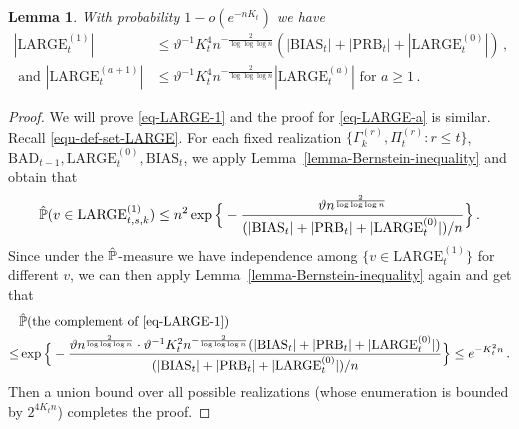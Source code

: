 \documentclass[11pt]{article}
\newtheorem{Lemma}[Theorem]{Lemma}
\numberwithin{equation}{section}
\begin{document}
\begin{Lemma} {\label{lemma-bound-cardinality-LARGE-(a)}}
With probability $1-o(e^{-n K_t})$ we have 
\begin{align}
    |\mathrm{LARGE}^{(1)}_t|& \leq \vartheta^{-1} K_t^4 n^{ -\frac{2}{\log \log \log n}} (| \mathrm{BIAS}_t | + |\mathrm{PRB}_t| + | \mathrm{LARGE}^{(0)}_t |)\,,  \label{eq-LARGE-1}\\
    \mbox{ and } |\mathrm{LARGE}^{(a+1)}_t| &\leq \vartheta^{-1} K_t^4 n^{- \frac{2}{\log \log \log n}} | \mathrm{LARGE}^{(a)}_t |\mbox{ for } a \geq 1\,. \label{eq-LARGE-a}
\end{align}
\end{Lemma}
\begin{proof}
We will prove  \eqref{eq-LARGE-1} and the proof for \eqref{eq-LARGE-a} is similar. Recall \eqref{equ-def-set-LARGE}. For each fixed realization $\{ \Gamma^{(r)}_k, \Pi^{(r)}_t : r \leq t \}$, $\mathrm{BAD}_{t-1}, \mathrm{LARGE}^{(0)}_t, \mathrm{BIAS}_t$, we apply Lemma~\ref{lemma-Bernstein-inequality} and obtain that
\begin{align*}
    \Hat{\mathbb P}(v \in \mathrm{LARGE}^{(1)}_{t,s,k}) \leq n^2 \exp \Big\{ - \frac{ \vartheta n^{ \frac{2}{\log \log \log n} } }{ (| \mathrm{BIAS}_t | + |\mathrm{PRB}_t| + | \mathrm{LARGE}^{(0)}_t |)/n } \Big\} \,.
\end{align*}
Since under the $\Hat{\mathbb P}$-measure we have  independence among $\{ v \in \mathrm{LARGE}^{(1)}_t \}$ for different $v$, we can then apply Lemma~\ref{lemma-Bernstein-inequality} again and get that 
\begin{align*}
   &\Hat{\mathbb P}(\mbox{the complement of }\eqref{eq-LARGE-1}) \\
   \leq & \exp \Big\{ - \frac{ \vartheta n^{ \frac{2}{\log \log \log n} } \cdot \vartheta^{-1} K_t^2 n^{ -\frac{2}{\log \log \log n}} (| \mathrm{BIAS}_t | + |\mathrm{PRB}_t| + | \mathrm{LARGE}^{(0)}_t |)  }{ (| \mathrm{BIAS}_t | + |\mathrm{PRB}_t| + | \mathrm{LARGE}^{(0)}_t |)/n }  \Big\} \leq  e^{-K_t^2 n }\,.
\end{align*}
Then a union bound over all possible realizations (whose enumeration is bounded by $2^{4 K_t n}$) completes the proof.
\end{proof}
\end{document}
